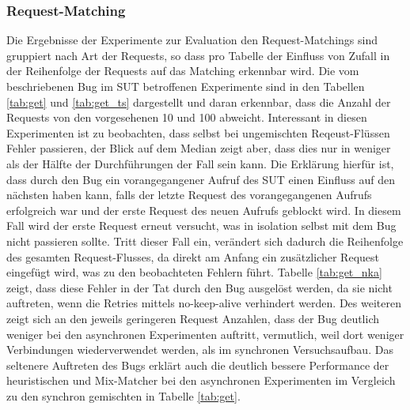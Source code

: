 \documentclass[12pt,a4paper]{report}
\begin{document}
\subsubsection{Request-Matching}
Die Ergebnisse der Experimente zur Evaluation den Request-Matchings sind gruppiert nach Art der Requests, so dass pro Tabelle
der Einfluss von Zufall in der Reihenfolge der Requests auf das Matching erkennbar wird. Die vom beschriebenen Bug im SUT
betroffenen Experimente sind in den Tabellen \ref{tab:get} und \ref{tab:get_ts} dargestellt und daran erkennbar, dass die Anzahl
der Requests von den vorgesehenen 10 und 100 abweicht. Interessant in diesen Experimenten ist zu beobachten, dass selbst bei
ungemischten Reqeust-Flüssen Fehler passieren, der Blick auf dem Median zeigt aber, dass dies nur in weniger als der Hälfte der
Durchführungen der Fall sein kann. Die Erklärung hierfür ist, dass durch den Bug ein vorangegangener Aufruf des SUT einen
Einfluss auf den nächsten haben kann, falls der letzte Request des vorangegangenen Aufrufs erfolgreich war und der erste Request
des neuen Aufrufs geblockt wird. In diesem Fall wird der erste Request erneut versucht, was in isolation selbst mit dem Bug
nicht passieren sollte. Tritt dieser Fall ein, verändert sich dadurch die Reihenfolge des gesamten Request-Flusses, da direkt am
Anfang ein zusätzlicher Request eingefügt wird, was zu den beobachteten Fehlern führt. Tabelle \ref{tab:get_nka} zeigt, dass
diese Fehler in der Tat durch den Bug ausgelöst werden, da sie nicht auftreten, wenn die Retries mittels no-keep-alive
verhindert werden. Des weiteren zeigt sich an den jeweils geringeren Request Anzahlen, dass der Bug deutlich weniger bei den
asynchronen Experimenten auftritt, vermutlich, weil dort weniger Verbindungen wiederverwendet werden, als im synchronen
Versuchsaufbau. Das seltenere Auftreten des Bugs erklärt auch die deutlich bessere Performance der heuristischen und Mix-Matcher
bei den asynchronen Experimenten im Vergleich zu den synchron gemischten in Tabelle \ref{tab:get}.
\end{document}
